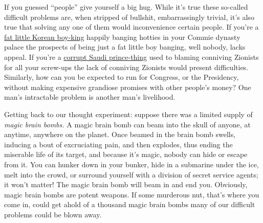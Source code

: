 If you guessed ``people'' give yourself a big hug. While it's true these
so-called difficult problems are, when stripped of bullshit,
embarrassingly trivial, it's also true that solving any one of them
would inconvenience certain people. If you're a
\href{http://www.telegraph.co.uk/news/picturegalleries/worldnews/9429104/North-Koreas-leader-Kim-Jong-un-and-his-wife-Ri-Sol-ju.html}{fat
little Korean boy-king} happily banging hotties in your Commie dynasty
palace the prospects of being just a fat little boy banging, well
nobody, lacks appeal. If you're a
\href{http://abcnews.go.com/2020/News/story?id=169246\&page=2}{corrupt
Saudi prince-thing} used to blaming conniving Zionists for all your
screw-ups the lack of conniving Zionists would present difficulties.
Similarly, how can you be expected to run for Congress, or the
Presidency, without making expensive grandiose promises with other
people's money? One man's intractable problem is another man's
livelihood.

Getting back to our thought experiment: suppose there was a limited
supply of \emph{magic brain bombs.} A magic brain bomb can beam into the
skull of anyone, at anytime, anywhere on the planet. Once beamed in the
brain bomb swells, inducing a bout of excruciating pain, and then
explodes, thus ending the miserable life of its target, and because it's
magic, nobody can hide or escape from it. You can hunker down in your
bunker, hide in a submarine under the ice, melt into the crowd, or
surround yourself with a division of secret service agents; it won't
matter! The magic brain bomb will beam in and end you. Obviously, magic
brain bombs are potent weapons. If some murderous nut, that's where you
come in, could get ahold of a thousand magic brain bombs many of our
difficult problems could be blown away.

